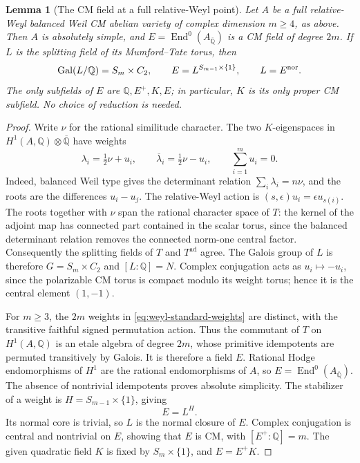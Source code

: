 \documentclass[11pt]{article}
\newtheorem{lemma}[theorem]{Lemma}
\theoremstyle{definition}
\theoremstyle{remark}
\begin{document}
\begin{lemma}[The CM field at a full relative-Weyl point]
\label{lem:weyl-cm-field}
Let $A$ be a full relative-Weyl balanced Weil CM abelian variety of
complex dimension $m\geq4$, as above. Then $A$ is absolutely simple,
and $E=\operatorname{End}^0(A_{\overline{\mathbb Q}})$ is a CM field
of degree $2m$. If $L$ is the splitting field of its Mumford--Tate
torus, then
\[
 \operatorname{Gal}(L/\mathbb Q)=S_m\times C_2,\qquad
 E=L^{S_{m-1}\times\{1\}},\qquad L=E^{\rm nor}.
\]
The only subfields of $E$ are $\mathbb Q,E^+,K,E$; in particular,
$K$ is its only proper CM subfield. No choice of reduction is needed.
\end{lemma}
\begin{proof}
Write $\nu$ for the rational similitude character.  The two
$K$-eigenspaces in $H^1(A,\mathbb Q)\otimes\overline{\mathbb Q}$
have weights
\begin{equation}
 \label{eq:weyl-standard-weights}
 \lambda_i=\tfrac12\nu+u_i,\qquad
 \overline\lambda_i=\tfrac12\nu-u_i,
 \qquad \sum_{i=1}^{m}u_i=0.
\end{equation}
Indeed, balanced Weil type gives the determinant relation
$\sum_i\lambda_i=n\nu$, and the roots are the differences
$u_i-u_j$.  The relative-Weyl action is
$(s,\epsilon)u_i=\epsilon u_{s(i)}$.
The roots together with $\nu$ span the rational character space of
$T$: the kernel of the adjoint map has connected part contained in
the scalar torus, since the balanced determinant relation removes
the connected norm-one central factor.  Consequently the splitting
fields of $T$ and $T^{\mathrm{ad}}$ agree.  The Galois group of $L$
is therefore $G=S_m\times C_2$ and $[L:\mathbb Q]=N$.
Complex conjugation acts as $u_i\mapsto-u_i$, since the
polarizable CM torus is compact modulo its weight torus; hence it
is the central element $(1,-1)$.

For $m\geq3$, the $2m$ weights in
\eqref{eq:weyl-standard-weights} are distinct, with the transitive
faithful signed permutation action.  Thus the commutant of $T$ on
$H^1(A,\mathbb Q)$ is an etale algebra of degree $2m$, whose
primitive idempotents are permuted transitively by Galois.  It is
therefore a field $E$.  Rational Hodge endomorphisms of $H^1$ are
the rational endomorphisms of $A$, so
$E=\operatorname{End}^0(A_{\overline{\mathbb Q}})$.
The absence of nontrivial idempotents proves absolute simplicity.
The stabilizer of a weight is $H=S_{m-1}\times\{1\}$, giving
\begin{equation}
 \label{eq:weyl-field-stabilizer}
 E=L^H.
\end{equation}
Its normal core is trivial, so $L$ is the normal closure of $E$.
Complex conjugation is central and nontrivial on $E$, showing that
$E$ is CM, with $[E^+:\mathbb Q]=m$.  The given quadratic field
$K$ is fixed by $S_m\times\{1\}$, and $E=E^+K$.


\end{proof}
\end{document}
